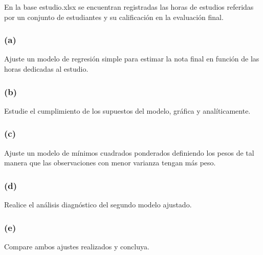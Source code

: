 \documentclass[
]{article}
\begin{document}
En la base estudio.xlsx se encuentran registradas las horas de estudios
referidas por un conjunto de estudiantes y su calificación en la
evaluación final.

\hypertarget{a-5}{%
\subsubsection{(a)}\label{a-5}}

Ajuste un modelo de regresión simple para estimar la nota final en
función de las horas dedicadas al estudio.

\hypertarget{b-5}{%
\subsubsection{(b)}\label{b-5}}

Estudie el cumplimiento de los supuestos del modelo, gráfica y
analíticamente.

\hypertarget{c-5}{%
\subsubsection{(c)}\label{c-5}}

Ajuste un modelo de mínimos cuadrados ponderados definiendo los pesos de
tal manera que las observaciones con menor varianza tengan más peso.

\hypertarget{d-4}{%
\subsubsection{(d)}\label{d-4}}

Realice el análisis diagnóstico del segundo modelo ajustado.

\hypertarget{e-3}{%
\subsubsection{(e)}\label{e-3}}

Compare ambos ajustes realizados y concluya.
\end{document}
